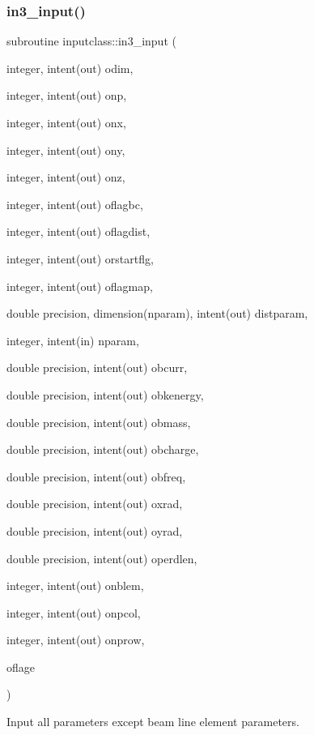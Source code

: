 \subsubsection{\texorpdfstring{in3\_input()}{in3\_input()}}
{\footnotesize\ttfamily subroutine inputclass\+::in3\+\_\+input (\begin{DoxyParamCaption}\item[{integer, intent(out)}]{odim,  }\item[{integer, intent(out)}]{onp,  }\item[{integer, intent(out)}]{onx,  }\item[{integer, intent(out)}]{ony,  }\item[{integer, intent(out)}]{onz,  }\item[{integer, intent(out)}]{oflagbc,  }\item[{integer, intent(out)}]{oflagdist,  }\item[{integer, intent(out)}]{orstartflg,  }\item[{integer, intent(out)}]{oflagmap,  }\item[{double precision, dimension(nparam), intent(out)}]{distparam,  }\item[{integer, intent(in)}]{nparam,  }\item[{double precision, intent(out)}]{obcurr,  }\item[{double precision, intent(out)}]{obkenergy,  }\item[{double precision, intent(out)}]{obmass,  }\item[{double precision, intent(out)}]{obcharge,  }\item[{double precision, intent(out)}]{obfreq,  }\item[{double precision, intent(out)}]{oxrad,  }\item[{double precision, intent(out)}]{oyrad,  }\item[{double precision, intent(out)}]{operdlen,  }\item[{integer, intent(out)}]{onblem,  }\item[{integer, intent(out)}]{onpcol,  }\item[{integer, intent(out)}]{onprow,  }\item[{}]{oflage }\end{DoxyParamCaption})}



Input all parameters except beam line element parameters. 

